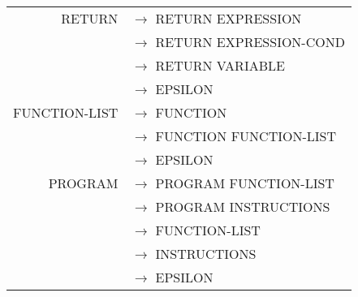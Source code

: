 \documentclass[a4paper,10pt]{article}
\begin{document}
\begin{tabular}{rl}
RETURN				& $\rightarrow$ RETURN EXPRESSION \\
					& $\rightarrow$ RETURN EXPRESSION-COND \\
					& $\rightarrow$ RETURN VARIABLE \\
					& $\rightarrow$ EPSILON \\
					
FUNCTION-LIST		& $\rightarrow$ FUNCTION \\
					& $\rightarrow$ FUNCTION FUNCTION-LIST\\
					& $\rightarrow$ EPSILON\\

PROGRAM				& $\rightarrow$ PROGRAM FUNCTION-LIST\\
					& $\rightarrow$ PROGRAM INSTRUCTIONS\\
					& $\rightarrow$ FUNCTION-LIST\\
					& $\rightarrow$ INSTRUCTIONS\\
					& $\rightarrow$ EPSILON\\
					
					
\end{tabular}








~\\
\end{document}
